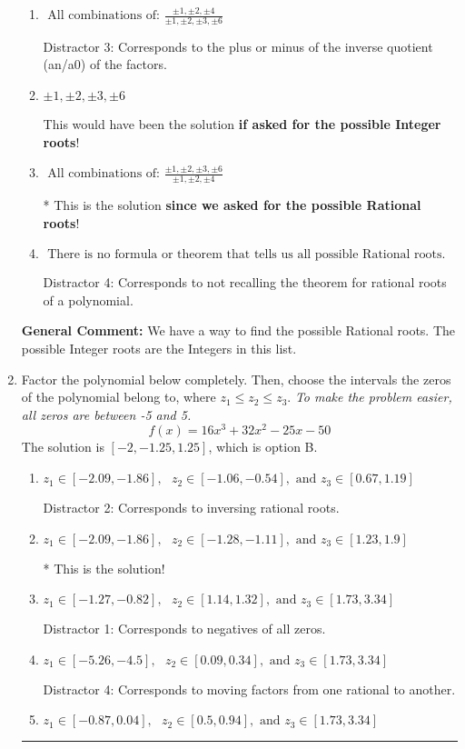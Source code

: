 \documentclass{extbook}[14pt]
\newcommand{\litem}[1]{\item #1

\rule{\textwidth}{0.4pt}}
\begin{document}
\begin{enumerate}
{\begin{enumerate}[label=\Alph*.]
 Distractor 1: Corresponds to the plus or minus factors of a1 only.
\item \( \text{ All combinations of: }\frac{\pm 1,\pm 2,\pm 4}{\pm 1,\pm 2,\pm 3,\pm 6} \)

 Distractor 3: Corresponds to the plus or minus of the inverse quotient (an/a0) of the factors. 
\item \( \pm 1,\pm 2,\pm 3,\pm 6 \)

This would have been the solution \textbf{if asked for the possible Integer roots}!
\item \( \text{ All combinations of: }\frac{\pm 1,\pm 2,\pm 3,\pm 6}{\pm 1,\pm 2,\pm 4} \)

* This is the solution \textbf{since we asked for the possible Rational roots}!
\item \( \text{ There is no formula or theorem that tells us all possible Rational roots.} \)

 Distractor 4: Corresponds to not recalling the theorem for rational roots of a polynomial.
\end{enumerate}

\textbf{General Comment:} We have a way to find the possible Rational roots. The possible Integer roots are the Integers in this list.
}
\litem{
Factor the polynomial below completely. Then, choose the intervals the zeros of the polynomial belong to, where $z_1 \leq z_2 \leq z_3$. \textit{To make the problem easier, all zeros are between -5 and 5.}
\[ f(x) = 16x^{3} +32 x^{2} -25 x -50 \]The solution is \( [-2, -1.25, 1.25] \), which is option B.\begin{enumerate}[label=\Alph*.]
\item \( z_1 \in [-2.09, -1.86], \text{   }  z_2 \in [-1.06, -0.54], \text{   and   } z_3 \in [0.67, 1.19] \)

 Distractor 2: Corresponds to inversing rational roots.
\item \( z_1 \in [-2.09, -1.86], \text{   }  z_2 \in [-1.28, -1.11], \text{   and   } z_3 \in [1.23, 1.9] \)

* This is the solution!
\item \( z_1 \in [-1.27, -0.82], \text{   }  z_2 \in [1.14, 1.32], \text{   and   } z_3 \in [1.73, 3.34] \)

 Distractor 1: Corresponds to negatives of all zeros.
\item \( z_1 \in [-5.26, -4.5], \text{   }  z_2 \in [0.09, 0.34], \text{   and   } z_3 \in [1.73, 3.34] \)

 Distractor 4: Corresponds to moving factors from one rational to another.
\item \( z_1 \in [-0.87, 0.04], \text{   }  z_2 \in [0.5, 0.94], \text{   and   } z_3 \in [1.73, 3.34] \)


\end{enumerate}}
\end{enumerate}
\end{document}
